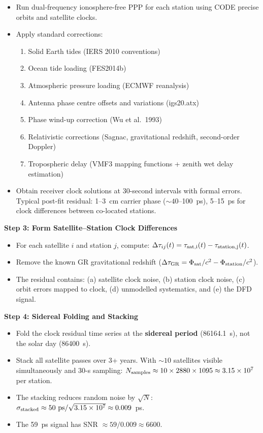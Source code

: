 \documentclass[11pt,a4paper]{article}
\newcommand{\ee}[1]{\times 10^{#1}}
\begin{document}
\begin{tcolorbox}[colback=green!3!white, colframe=green!60!black,
  title=\textbf{GPS 59~ps Extraction Protocol --- Actionable for Geodesists}]
\begin{itemize}[nosep]
\item Run dual-frequency ionosphere-free PPP for each station using
  CODE precise orbits and satellite clocks.
\item Apply standard corrections:
  \begin{enumerate}[nosep]
  \item Solid Earth tides (IERS 2010 conventions)
  \item Ocean tide loading (FES2014b)
  \item Atmospheric pressure loading (ECMWF reanalysis)
  \item Antenna phase centre offsets and variations (igs20.atx)
  \item Phase wind-up correction (Wu et al.\ 1993)
  \item Relativistic corrections (Sagnac, gravitational redshift,
    second-order Doppler)
  \item Tropospheric delay (VMF3 mapping functions + zenith
    wet delay estimation)
  \end{enumerate}
\item Obtain receiver clock solutions at 30-second intervals with
  formal errors. Typical post-fit residual: 1--3~cm carrier phase
  ($\sim 40$--100~ps), 5--15~ps for clock differences between
  co-located stations.
\end{itemize}

\textbf{Step 3: Form Satellite--Station Clock Differences}

\begin{itemize}[nosep]
\item For each satellite $i$ and station $j$, compute:
  $\Delta\tau_{ij}(t) = \tau_{\rm sat,i}(t) - \tau_{\rm station,j}(t)$.
\item Remove the known GR gravitational redshift
  ($\Delta\tau_{\rm GR} = \Phi_{\rm sat}/c^2 - \Phi_{\rm station}/c^2$).
\item The residual contains: (a) satellite clock noise,
  (b) station clock noise, (c) orbit errors mapped to clock,
  (d) unmodelled systematics, and (e) the DFD signal.
\end{itemize}

\textbf{Step 4: Sidereal Folding and Stacking}

\begin{itemize}[nosep]
\item Fold the clock residual time series at the \textbf{sidereal
  period} (86164.1~s), not the solar day (86400~s).
\item Stack all satellite passes over 3+ years. With $\sim 10$
  satellites visible simultaneously and 30-s sampling:
  $N_{\rm samples} \approx 10 \times 2880 \times 1095 \approx
  3.15\ee{7}$ per station.
\item The stacking reduces random noise by $\sqrt{N}$:
  $\sigma_{\rm stacked} \approx 50~\text{ps}/\sqrt{3.15\ee{7}}
  \approx 0.009$~ps.
\item The 59~ps signal has SNR $\approx 59/0.009 \approx 6600$.
\end{itemize}


\end{tcolorbox}
\end{document}
